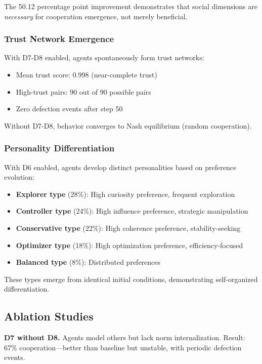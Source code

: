 \documentclass{article}
\begin{document}
The 50.12 percentage point improvement demonstrates that social dimensions are \textit{necessary} for cooperation emergence, not merely beneficial.

\subsubsection{Trust Network Emergence}

With D7-D8 enabled, agents spontaneously form trust networks:
\begin{itemize}
    \item Mean trust score: 0.998 (near-complete trust)
    \item High-trust pairs: 90 out of 90 possible pairs
    \item Zero defection events after step 50
\end{itemize}

Without D7-D8, behavior converges to Nash equilibrium (random cooperation).

\subsubsection{Personality Differentiation}

With D6 enabled, agents develop distinct personalities based on preference evolution:
\begin{itemize}
    \item \textbf{Explorer type} (28\%): High curiosity preference, frequent exploration
    \item \textbf{Controller type} (24\%): High influence preference, strategic manipulation
    \item \textbf{Conservative type} (22\%): High coherence preference, stability-seeking
    \item \textbf{Optimizer type} (18\%): High optimization preference, efficiency-focused
    \item \textbf{Balanced type} (8\%): Distributed preferences
\end{itemize}

These types emerge from identical initial conditions, demonstrating self-organized differentiation.

\subsection{Ablation Studies}

\textbf{D7 without D8.} Agents model others but lack norm internalization. Result: 67\% cooperation---better than baseline but unstable, with periodic defection events.
\end{document}
